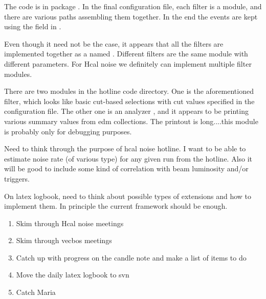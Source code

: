 
The code is in package
.
In the final configuration file, each filter is a module, and
there are various paths assembling them together.  In the end
the events are kept using the  field in
.

Even though it need not be the case, it appears that all the
filters are implemented together as a  named .
Different filters are the same module with different parameters.
For Hcal noise we definitely can implement multiple filter modules.

There are two modules in the hotline code directory.  One is the
aforementioned  filter, which looks like basic cut-based
selections with cut values specified in the configuration file.
The other one is an analyzer , and it appears to
be printing various summary values from edm collections.
The printout is long....this module is probably only for debugging purposes.



Need to think through the purpose of hcal noise hotline.
I want to be able to estimate noise rate (of various type)
for any given run from the hotline.  Also it will be good to
include some kind of correlation with beam luminosity and/or
triggers.

On latex logbook, need to think about possible types of extensions
and how to implement them.  In principle the current framework
should be enough.



\begin{enumerate}
\item Skim through Hcal noise meetings
\item Skim through vecbos meetings
\item Catch up with progress on the candle note and make a list of items to do
\item Move the daily latex logbook to svn
\item Catch Maria
\end{enumerate}



